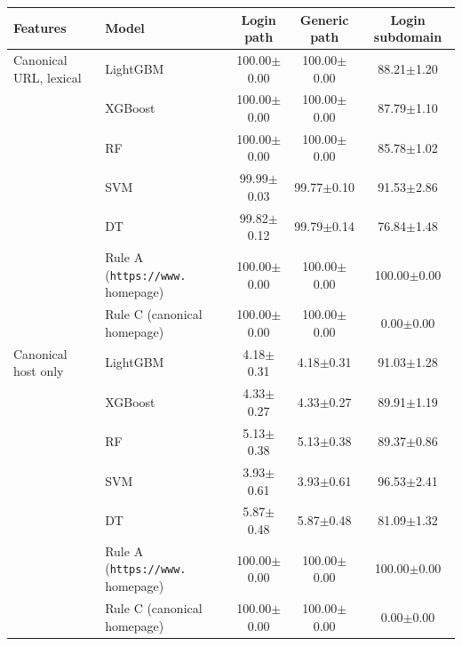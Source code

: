 \begin{tabular}{@{}llccc@{}}
\toprule
\textbf{Features} & \textbf{Model} & \textbf{Login path} & \textbf{Generic path} & \textbf{Login subdomain}\\
\midrule
Canonical URL, lexical & LightGBM & 100.00{\tiny$\pm$0.00} & 100.00{\tiny$\pm$0.00} & 88.21{\tiny$\pm$1.20}\\
 & XGBoost & 100.00{\tiny$\pm$0.00} & 100.00{\tiny$\pm$0.00} & 87.79{\tiny$\pm$1.10}\\
 & RF & 100.00{\tiny$\pm$0.00} & 100.00{\tiny$\pm$0.00} & 85.78{\tiny$\pm$1.02}\\
 & SVM & 99.99{\tiny$\pm$0.03} & 99.77{\tiny$\pm$0.10} & 91.53{\tiny$\pm$2.86}\\
 & DT & 99.82{\tiny$\pm$0.12} & 99.79{\tiny$\pm$0.14} & 76.84{\tiny$\pm$1.48}\\
 & Rule A (\texttt{https://www.} homepage) & 100.00{\tiny$\pm$0.00} & 100.00{\tiny$\pm$0.00} & 100.00{\tiny$\pm$0.00}\\
 & Rule C (canonical homepage) & 100.00{\tiny$\pm$0.00} & 100.00{\tiny$\pm$0.00} & 0.00{\tiny$\pm$0.00}\\
\midrule
Canonical host only & LightGBM & 4.18{\tiny$\pm$0.31} & 4.18{\tiny$\pm$0.31} & 91.03{\tiny$\pm$1.28}\\
 & XGBoost & 4.33{\tiny$\pm$0.27} & 4.33{\tiny$\pm$0.27} & 89.91{\tiny$\pm$1.19}\\
 & RF & 5.13{\tiny$\pm$0.38} & 5.13{\tiny$\pm$0.38} & 89.37{\tiny$\pm$0.86}\\
 & SVM & 3.93{\tiny$\pm$0.61} & 3.93{\tiny$\pm$0.61} & 96.53{\tiny$\pm$2.41}\\
 & DT & 5.87{\tiny$\pm$0.48} & 5.87{\tiny$\pm$0.48} & 81.09{\tiny$\pm$1.32}\\
 & Rule A (\texttt{https://www.} homepage) & 100.00{\tiny$\pm$0.00} & 100.00{\tiny$\pm$0.00} & 100.00{\tiny$\pm$0.00}\\
 & Rule C (canonical homepage) & 100.00{\tiny$\pm$0.00} & 100.00{\tiny$\pm$0.00} & 0.00{\tiny$\pm$0.00}\\
\bottomrule
\end{tabular}
